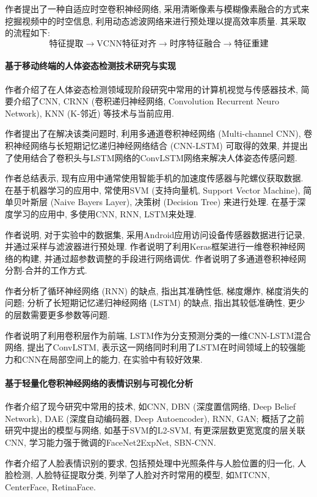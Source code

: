 \documentclass[]{ctexart}
\begin{document}
    作者提出了一种自适应时空卷积神经网络, 采用清晰像素与模糊像素融合的方式来挖掘视频中的时空信息, 利用动态滤波网络来进行预处理以提高效率质量. 其采取的流程如下: 
$$
\text{特征提取} \rightarrow \text{VCNN特征对齐} \rightarrow \text{时序特征融合} \rightarrow \text{特征重建}
$$

\paragraph{基于移动终端的人体姿态检测技术研究与实现\cite{bodyPosition}}作者介绍了在人体姿态检测领域现阶段研究中常用的计算机视觉与传感器技术, 简要介绍了CNN, CRNN (卷积递归神经网络, Convolution Recurrent Neuro Network), KNN (K-邻近) 等技术与当前应用. 

	作者提出了在解决该类问题时, 利用多通道卷积神经网络 (Multi-channel CNN), 卷积神经网络与长短期记忆递归神经网络结合 (CNN-LSTM) 可取得的效果, 并提出了使用结合了卷积头与LSTM网络的ConvLSTM网络来解决人体姿态传感问题. 

	作者总结表示, 现有应用中通常使用智能手机的加速度传感器与陀螺仪获取数据. 在基于机器学习的应用中, 常使用SVM (支持向量机, Support Vector Machine), 简单贝叶斯层 (Naive Bayers Layer), 决策树 (Decision Tree) 来进行处理. 在基于深度学习的应用中, 多使用CNN, RNN, LSTM来处理. 
	
	作者说明, 对于实验中的数据集, 采用Android应用访问设备传感器数据进行记录, 并通过采样与滤波器进行预处理. 作者说明了利用Keras框架进行一维卷积神经网络的构建, 并通过超参数调整的手段进行网络调优. 作者说明了多通道卷积神经网分割-合并的工作方式. 
	
	作者分析了循环神经网络 (RNN) 的缺点, 指出其准确性低, 梯度爆炸, 梯度消失的问题; 分析了长短期记忆递归神经网络 (LSTM) 的缺点, 指出其较低准确性, 更少的层数需要更多参数等问题. 
	
	作者说明了利用卷积层作为前端, LSTM作为分支预测分类的一维CNN-LSTM混合网络, 提出了ConvLSTM, 表示这一网络同时利用了LSTM在时间领域上的较强能力和CNN在局部空间上的能力, 在实验中有较好效果. 
	
\paragraph{基于轻量化卷积神经网络的表情识别与可视化分析\cite{faceExp}} 作者介绍了现今研究中常用的技术, 如CNN, DBN (深度置信网络, Deep Belief Network), DAE (深度自动编码器, Deep Autoencoder), RNN, GAN; 概括了之前研究中提出的模型与网络, 如基于SVM的L2-SVM, 有更深层数更宽宽度的层关联CNN, 学习能力强于微调的FaceNet2ExpNet, SBN-CNN. 

	作者介绍了人脸表情识别的要求, 包括预处理中光照条件与人脸位置的归一化, 人脸检测, 人脸特征提取分类, 列举了人脸对齐时常用的模型, 如MTCNN, CenterFace, RetinaFace. 
	
\end{document}
